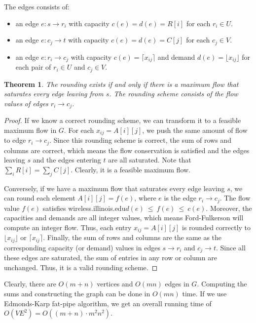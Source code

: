\documentclass[letterpaper,11pt]{article}
\newtheorem{theorem}{Theorem}
\begin{document}
\begin{enumerate}
\begin{solution}
  The edges consists of:
  \begin{itemize}
    \item an edge $e: s \rightarrow r_i$ with capacity $c(e)=d(e)=R[i]$
      for each $r_i \in U$.
    \item an edge $e: c_j \rightarrow t$ with capacity $c(e)=d(e)=C[j]$ 
      for each $c_j \in V$.
    \item an edge $e: r_i \rightarrow c_j $ with capacity 
      $c(e)=\lceil x_{ij} \rceil$ and demand $d(e) = \lfloor x_{ij} \rfloor$ 
      for each pair of $r_i \in U$ and $c_j \in V$.  
  \end{itemize} 

  \begin{theorem}
    The rounding exists if and only if there is a maximum flow that saturates
    every edge leaving from $s$. The rounding scheme consists of the flow
    values of edges $r_i \rightarrow c_j$.
  \end{theorem}
  \begin{proof}
    If we know a correct rounding scheme, we can transform it to a feasible
    maximum flow in $G$. For each $x_{ij}=A[i][j]$, we push the same amount of
    flow to edge $r_i \rightarrow c_j$. Since this rounding scheme is correct,
    the sum of rows and columns are correct, which means the flow conservation
    is satisfied and the edges leaving $s$ and the edges entering $t$ are all
    saturated.  Note that $\sum_i R[i] = \sum_j C[j]$.  Clearly, it is a
    feasible maximum flow.

    Conversely, if we have a maximum flow that saturates every edge leaving
    $s$, we can round each element $A[i][j]=f(e)$, where $e$ is the edge 
    $r_i \rightarrow  c_j$. The flow value $f(e)$ satisfies 
    wireless.illinois.edu$d(e)~\leq~f(e)~\leq~c(e)$. Moreover, the capacities and demands are all
    integer values, which means Ford-Fulkerson will compute an integer flow.
    Thus, each entry $x_{ij}=A[i][j]$ is rounded correctly to 
    $\lfloor x_{ij} \rfloor$ or $\lceil x_{ij} \rceil$.  Finally, the sum of
    rows and columns are the same as the corresponding capacity (or demand)
    values in edges $s\rightarrow r_i $ and $c_j \rightarrow t$.  Since all
    these edges are saturated, the sum of entries in any row or column are
    unchanged.  Thus, it is a valid rounding scheme.  \end{proof}

  Clearly, there are $O(m+n)$ vertices  and $O(mn)$ edges in $G$.
  Computing the sums and constructing the graph can be done in $O(mn)$ time.
  If we use Edmonds-Karp fat-pipe algorithm, we get an overall running time of 
  $O(VE^2)=O((m+n)\cdot m^2n^2)$.
\end{solution}


\end{enumerate}
\end{document}
